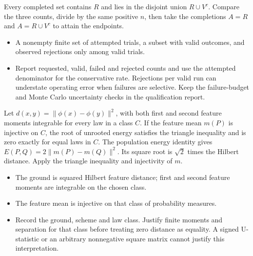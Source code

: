 \expandafter\def\csname statadic@proof@STATADIC-QUALIFICATION-001\endcsname{Every completed set contains $R$ and lies in the disjoint union
  $R\cup V^c$. Compare the three counts, divide by the same positive $n$, then
  take the completions $A=R$ and $A=R\cup V^c$ to attain the endpoints.}
\expandafter\def\csname statadic@assumptions@STATADIC-QUALIFICATION-001\endcsname{\begin{itemize}
\item A nonempty finite set of attempted trials, a subset with valid outcomes, and observed rejections only among valid trials.
\end{itemize}}
\expandafter\def\csname statadic@diagnostics@STATADIC-QUALIFICATION-001\endcsname{\begin{itemize}
\item Report requested, valid, failed and rejected counts and use the attempted denominator for the conservative rate. Rejections per valid run can understate operating error when failures are selective. Keep the failure-budget and Monte Carlo uncertainty checks in the qualification report.
\end{itemize}}
\expandafter\def\csname statadic@statement@STATADIC-ROOTENERGY-001\endcsname{Let $d(x,y)=\|\phi(x)-\phi(y)\|^2$, with both first and second
  feature moments integrable for every law in a class $C$. If the feature mean
  $m(P)$ is injective on $C$, the root of unrooted energy satisfies the triangle
  inequality and is zero exactly for equal laws in $C$.}
\expandafter\def\csname statadic@proof@STATADIC-ROOTENERGY-001\endcsname{The population energy identity gives
  $E(P,Q)=2\|m(P)-m(Q)\|^2$. Its square root is $\sqrt 2$ times
  the Hilbert distance. Apply the triangle inequality and injectivity of $m$.}
\expandafter\def\csname statadic@assumptions@STATADIC-ROOTENERGY-001\endcsname{\begin{itemize}
\item The ground is squared Hilbert feature distance; first and second feature moments are integrable on the chosen class.
\item The feature mean is injective on that class of probability measures.
\end{itemize}}
\expandafter\def\csname statadic@diagnostics@STATADIC-ROOTENERGY-001\endcsname{\begin{itemize}
\item Record the ground, scheme and law class. Justify finite moments and separation for that class before treating zero distance as equality. A signed U-statistic or an arbitrary nonnegative square matrix cannot justify this interpretation.
\end{itemize}}

